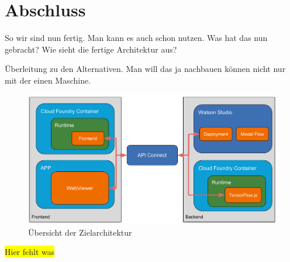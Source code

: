 \section{Abschluss}
So wir sind nun fertig. Man kann es auch schon nutzen. Was hat das nun gebracht? Wie sieht die fertige Architektur aus?

Überleitung zu den Alternativen. Man will das ja nachbauen können nicht nur mit der einen Maschine.

\begin{figure}[h]
    \centering
    \includegraphics[width=\textwidth]{images/kapitel_4/architektur_uebersicht.pdf}
    \caption{Übersicht der Zielarchitektur}
    \label{fig:umsetzung_zielarchitektur_4}
\end{figure}

\colorbox{yellow}{Hier fehlt was}